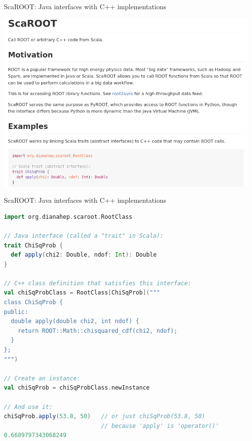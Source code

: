 \documentclass{beamer}
\begin{document}
\begin{frame}{ScaROOT: Java interfaces with C++ implementations}

\vfill
{}

\vfill
\includegraphics[width=\linewidth]{wiki.png}
\end{frame}

\begin{frame}[fragile]{ScaROOT: Java interfaces with C++ implementations}
\begin{lstlisting}[language=scala]
import org.dianahep.scaroot.RootClass

// Java interface (called a "trait" in Scala):
trait ChiSqProb {
  def apply(chi2: Double, ndof: Int): Double
}

// C++ class definition that satisfies this interface:
val chiSqProbClass = RootClass[ChiSqProb]("""
class ChiSqProb {
public:
  double apply(double chi2, int ndof) {
    return ROOT::Math::chisquared_cdf(chi2, ndof);
  }
};
""")

// Create an instance:
val chiSqProb = chiSqProbClass.newInstance

// And use it:
chiSqProb.apply(53.8, 50)   // or just chiSqProb(53.8, 50)
                            // because 'apply' is 'operator()'
0.6689797343068249
\end{lstlisting}
\end{frame}
\end{document}
